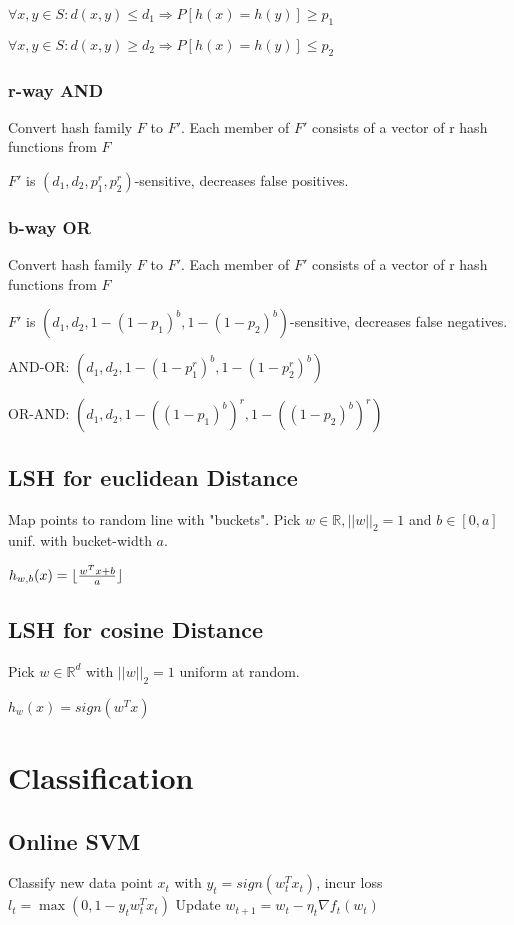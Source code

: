 \documentclass[a4paper,11pt,twocolumn]{article}
\begin{document}
$\forall x,y \in S : d(x,y) \leq  d_1 \Rightarrow P[h(x)=h(y)] \geq p_1$

$\forall x,y \in S : d(x,y) \geq  d_2 \Rightarrow P[h(x)=h(y)] \leq p_2$

\subsubsection{r-way AND}
Convert hash family $F$ to $F'$. Each member of $F'$ consists of a vector of r hash functions from $F$

$F'$ is $(d_1, d_2, p_1^r, p_2^r)$-sensitive, decreases false positives.

\subsubsection{b-way OR}
Convert hash family $F$ to $F'$. Each member of $F'$ consists of a vector of r hash functions from $F$

$F'$ is $(d_1, d_2, 1-(1-p_1)^b, 1-(1-p_2)^b)$-sensitive, decreases false negatives.

AND-OR: $(d_1,d_2,1-(1-p_1^r)^b,1-(1-p_2^r)^b)$

OR-AND: $(d_1,d_2,1-((1-p_1)^b)^r,1-((1-p_2)^b)^r)$




\subsection{LSH for euclidean Distance}
Map points to random line with "buckets". Pick $w \in \mathbb{R}, ||w||_2 = 1$ and $b \in [0,a]$ unif. with bucket-width $a$.

$h_{w,b}(x) = 
\lfloor
{{w^Tx + b}\over{a}}
\rfloor$

\subsection{LSH for cosine Distance}
Pick $w \in \mathbb{R}^d$ with $||w||_2=1$ uniform at random.

$h_w(x) = sign(w^Tx)$

\section{Classification}

\subsection{Online SVM}
Classify new data point $x_t$ with $y_t = sign(w_t^Tx_t)$, incur loss $l_t = \max (0,1-y_t w_t^T x_t)$ Update $w_{t+1} = w_t - \eta_t \nabla f_t(w_t)$
\end{document}
